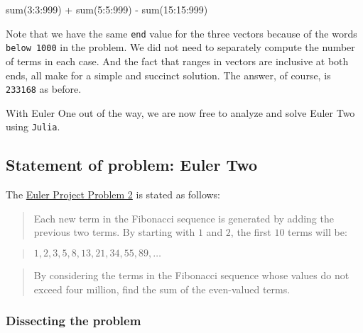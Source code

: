 \documentclass[
  a4paper,
]{article}
\newenvironment{Shaded}{\begin{snugshade}}{\end{snugshade}}
\newcommand{\FloatTok}[1]{\textcolor[rgb]{0.75,0.75,0.82}{#1}}
\newcommand{\FunctionTok}[1]{\textcolor[rgb]{0.94,0.94,0.56}{#1}}
\newcommand{\NormalTok}[1]{\textcolor[rgb]{0.80,0.80,0.80}{#1}}
\newcommand{\OperatorTok}[1]{\textcolor[rgb]{0.94,0.94,0.82}{#1}}
\begin{document}
\begin{Shaded}
\begin{Highlighting}[]
\FunctionTok{sum}\NormalTok{(}\FloatTok{3}\OperatorTok{:}\FloatTok{3}\OperatorTok{:}\FloatTok{999}\NormalTok{) }\OperatorTok{+} \FunctionTok{sum}\NormalTok{(}\FloatTok{5}\OperatorTok{:}\FloatTok{5}\OperatorTok{:}\FloatTok{999}\NormalTok{) }\OperatorTok{{-}} \FunctionTok{sum}\NormalTok{(}\FloatTok{15}\OperatorTok{:}\FloatTok{15}\OperatorTok{:}\FloatTok{999}\NormalTok{)}
\end{Highlighting}
\end{Shaded}

Note that we have the same \texttt{end} value for the three vectors
because of the words \texttt{below\ 1000} in the problem. We did not
need to separately compute the number of terms in each case. And the
fact that ranges in vectors are inclusive at both ends, all make for a
simple and succinct solution. The answer, of course, is \texttt{233168}
as before.

With Euler One out of the way, we are now free to analyze and solve
Euler Two using \texttt{Julia}.

\hypertarget{statement-of-problem-euler-two}{%
\subsection{Statement of problem: Euler
Two}\label{statement-of-problem-euler-two}}

The \href{https://projecteuler.net/problem=2}{Euler Project Problem 2}
is stated as follows:

\begin{quote}
Each new term in the Fibonacci sequence is generated by adding the
previous two terms. By starting with \(1\) and \(2\), the first \(10\)
terms will be:
\end{quote}

\begin{quote}
\(1, 2, 3, 5, 8, 13, 21, 34, 55, 89, \ldots\)
\end{quote}

\begin{quote}
By considering the terms in the Fibonacci sequence whose values do not
exceed four million, find the sum of the even-valued terms.
\end{quote}

\hypertarget{dissecting-the-problem}{%
\subsubsection{Dissecting the problem}\label{dissecting-the-problem}}
\end{document}
